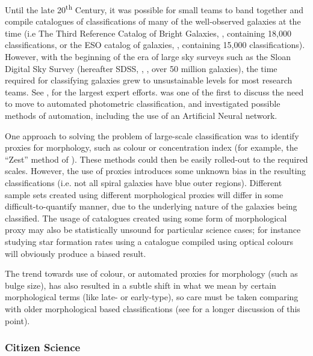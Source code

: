 \documentclass[../main.tex]{subfiles}
\begin{document}
Until the late 20\textsuperscript{th} Century, it was possible for small teams to band together and compile catalogues of classifications of many of the well-observed galaxies at the time (i.e The Third Reference Catalog of Bright Galaxies, \citealt{deVaucouleurs1991}, containing 18,000 classifications, or the ESO catalog of galaxies, \citealt{1989Msngr..56...31L}, containing 15,000 classifications). However, with the beginning of the era of large sky surveys such as the Sloan Digital Sky Survey (hereafter SDSS, \citealt{2017AJ....154...28B}, \citealt{SDSSDR7}, over 50 million galaxies), the time required for classifying galaxies grew to unsustainable levels for most research teams. See \citet{2010yCat..21860427N}, \citet{2007ApJS..173..512S} for the largest expert efforts. \citet{Naim1995:astro-ph/9502078v1} was one of the first to discuss the need to move to automated photometric classification, and investigated possible methods of automation, including the use of an Artificial Neural network.

One approach to solving the problem of large-scale classification was to identify proxies for morphology, such as colour or concentration index (for example, the ``Zest'' method of  \citet{Scarlata2007:astro-ph/0701746v2}). These methods could then be easily rolled-out to the required scales. However, the use of proxies introduces some unknown bias in the resulting classifications (i.e. not all spiral galaxies have blue outer regions). Different sample sets created using different morphological proxies will differ in some difficult-to-quantify manner, due to the underlying nature of the galaxies being classified. The usage of catalogues created using some form of morphological proxy may also be statistically unsound for particular science cases; for instance studying star formation rates using a catalogue compiled using optical colours will obviously produce a biased result.

The trend towards use of colour, or automated proxies for morphology (such as bulge size), has also resulted in a subtle shift in what we mean by certain morphological terms (like late- or early-type), so care must be taken comparing with older morphological based classifications (see \citealt{Masters2019:1904.11436v1} for a longer discussion of this point).

\subsubsection{Citizen Science}
\end{document}
